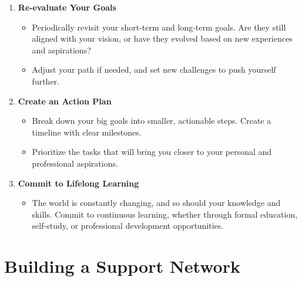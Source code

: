 \documentclass[
  letterpaper,
  DIV=11,
  numbers=noendperiod]{scrreprt}
\providecommand{\tightlist}{%
  \setlength{\itemsep}{0pt}\setlength{\parskip}{0pt}}\usepackage{longtable,booktabs,array}
\begin{document}
\begin{enumerate}
\def\labelenumi{\arabic{enumi}.}
\item
  \textbf{Re-evaluate Your Goals}

  \begin{itemize}
  \tightlist
  \item
    Periodically revisit your short-term and long-term goals. Are they
    still aligned with your vision, or have they evolved based on new
    experiences and aspirations?
  \item
    Adjust your path if needed, and set new challenges to push yourself
    further.
  \end{itemize}
\item
  \textbf{Create an Action Plan}

  \begin{itemize}
  \tightlist
  \item
    Break down your big goals into smaller, actionable steps. Create a
    timeline with clear milestones.
  \item
    Prioritize the tasks that will bring you closer to your personal and
    professional aspirations.
  \end{itemize}
\item
  \textbf{Commit to Lifelong Learning}

  \begin{itemize}
  \tightlist
  \item
    The world is constantly changing, and so should your knowledge and
    skills. Commit to continuous learning, whether through formal
    education, self-study, or professional development opportunities.
  \end{itemize}
\end{enumerate}

\section{Building a Support Network}\label{building-a-support-network}
\end{document}
